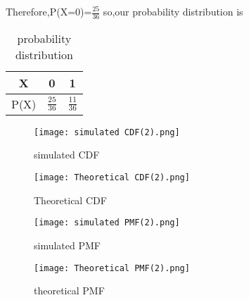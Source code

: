 \documentclass[11pt,a4paper,twocolumn]{article}
\begin{document}
Therefore,P(X=0)=$\frac{25}{36}$
so,our probability distribution is
\begin{table}[ht]
    \centering
    \begin{tabular}{|c|c|c|}
    \hline
         X&0&1  \\
         \hline
         P(X)&$\frac{25}{36}$&$\frac{11}{36}$\\[5pt]
         \hline
    \end{tabular}
    \caption{probability distribution}
    \label{tab:my_label}
\end{table}
\begin{figure}[h!]
    \centering
    \texttt{[image: simulated CDF(2).png]}
    \caption{simulated CDF}
\end{figure}
\begin{figure}[h!]
    \centering
    \texttt{[image: Theoretical CDF(2).png]} 
    \caption{Theoretical CDF}
\end{figure}
\begin{figure}[h!]
    \centering
    \texttt{[image: simulated PMF(2).png]} 
    \caption{simulated PMF}
\end{figure}
\begin{figure}[h!]
    \centering
    \texttt{[image: Theoretical PMF(2).png]}
    \caption{theoretical PMF}
\end{figure}
\end{document}
